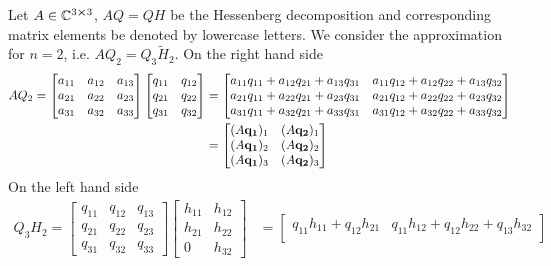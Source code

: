\begin{example}
	Let \(A\in \mathbb{C}^{3\cross 3}\), \(AQ=QH\) be the Hessenberg decomposition and corresponding matrix elements
	be denoted by lowercase letters. We consider the approximation for \(n = 2\), i.e. \(AQ_2 = Q_3 \tilde{H}_2\).
	On the right hand side
	\begin{align*}
		AQ_2 = 
		\begin{bmatrix}
			a_{11} & a_{12} & a_{13} \\
			a_{21} & a_{22} & a_{23} \\
			a_{31} & a_{32} & a_{33}
			\end{bmatrix}
			\begin{bmatrix}
			q_{11} & q_{12} \\
			q_{21} & q_{22} \\
			q_{31} & q_{32}
			\end{bmatrix}
			&=
			\begin{bmatrix}
			a_{11}q_{11} + a_{12}q_{21} + a_{13}q_{31} & a_{11}q_{12} + a_{12}q_{22} + a_{13}q_{32} \\
			a_{21}q_{11} + a_{22}q_{21} + a_{23}q_{31} & a_{21}q_{12} + a_{22}q_{22} + a_{23}q_{32} \\
			a_{31}q_{11} + a_{32}q_{21} + a_{33}q_{31} & a_{31}q_{12} + a_{32}q_{22} + a_{33}q_{32}
			\end{bmatrix} \\
			&=
			\begin{bmatrix}
				(A\vectorbold{q_1})_1 & (A\vectorbold{q_2})_1 \\
				(A\vectorbold{q_1})_2 & (A\vectorbold{q_2})_2 \\
				(A\vectorbold{q_1})_3 & (A\vectorbold{q_2})_3
			\end{bmatrix}
	\end{align*}
	On the left hand side
	\begin{align*}
		Q_3 H_2 = 
		\begin{bmatrix}
			q_{11} & q_{12} & q_{13} \\
			q_{21} & q_{22} & q_{23} \\
			q_{31} & q_{32} & q_{33}
			\end{bmatrix}
			\begin{bmatrix}
			h_{11} & h_{12} \\
			h_{21} & h_{22} \\
			0 & h_{32}
			\end{bmatrix}
			&=
			\begin{bmatrix}
				q_{11}h_{11} + q_{12}h_{21} & q_{11}h_{12} + q_{12}h_{22} + q_{13}h_{32} \\

\end{bmatrix}
\end{align*}
\end{example}

